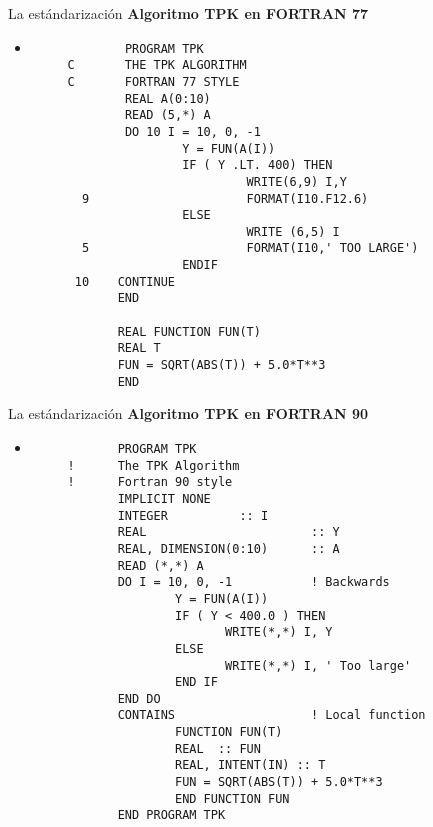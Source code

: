 \begin{frame}[fragile]{La estándarización}
    \textbf{Algoritmo TPK en FORTRAN 77}
    \begin{itemize}
    \item []
     \begin{verbatim}
             PROGRAM TPK
     C       THE TPK ALGORITHM
     C       FORTRAN 77 STYLE
             REAL A(0:10)
             READ (5,*) A
             DO 10 I = 10, 0, -1
                     Y = FUN(A(I))
                     IF ( Y .LT. 400) THEN
                              WRITE(6,9) I,Y
       9                      FORMAT(I10.F12.6)
                     ELSE
                              WRITE (6,5) I
       5                      FORMAT(I10,' TOO LARGE')
                     ENDIF
      10    CONTINUE
            END

            REAL FUNCTION FUN(T)
            REAL T
            FUN = SQRT(ABS(T)) + 5.0*T**3
            END
     \end{verbatim}
    \end{itemize}
\end{frame}


\begin{frame}[fragile]{La estándarización}
    \textbf{Algoritmo TPK en FORTRAN 90}
    \begin{itemize}
    \item []
     \begin{verbatim}
            PROGRAM TPK
     !      The TPK Algorithm
     !      Fortran 90 style
            IMPLICIT NONE
            INTEGER          :: I
            REAL                       :: Y
            REAL, DIMENSION(0:10)      :: A
            READ (*,*) A
            DO I = 10, 0, -1           ! Backwards
                    Y = FUN(A(I))
                    IF ( Y < 400.0 ) THEN
                           WRITE(*,*) I, Y
                    ELSE
                           WRITE(*,*) I, ' Too large'
                    END IF
            END DO
            CONTAINS                   ! Local function
                    FUNCTION FUN(T)
                    REAL  :: FUN
                    REAL, INTENT(IN) :: T
                    FUN = SQRT(ABS(T)) + 5.0*T**3
                    END FUNCTION FUN
            END PROGRAM TPK
     \end{verbatim}
    \end{itemize}
\end{frame}

